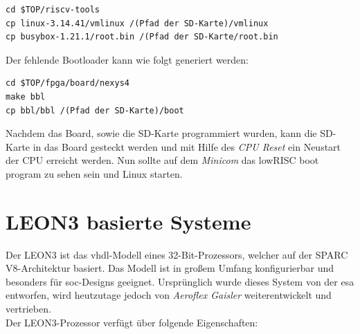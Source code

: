 \begin{lstlisting}
cd $TOP/riscv-tools
cp linux-3.14.41/vmlinux /(Pfad der SD-Karte)/vmlinux
cp busybox-1.21.1/root.bin /(Pfad der SD-Karte/root.bin
\end{lstlisting}


Der fehlende Bootloader kann wie folgt generiert werden:\\

\begin{lstlisting}
cd $TOP/fpga/board/nexys4
make bbl
cp bbl/bbl /(Pfad der SD-Karte)/boot
\end{lstlisting}

Nachdem das Board, sowie die SD-Karte programmiert wurden, kann die SD-Karte in das Board gesteckt werden und mit Hilfe des \emph{CPU Reset} ein Neustart der CPU erreicht werden.
Nun sollte auf dem \emph{Minicom} das lowRISC boot program zu sehen sein und Linux starten.\\
\newpage

\section{LEON3 basierte Systeme}\label{kap:leon3}

Der LEON3 ist das \ac{vhdl}-Modell eines 32-Bit-Prozessors, welcher auf der SPARC V8-Architektur basiert. Das Modell ist in großem Umfang konfigurierbar und besonders für \ac{soc}-Designs geeignet.
Ursprünglich wurde dieses System von der \ac{esa} entworfen, wird heutzutage jedoch von \emph{Aeroflex Gaisler} weiterentwickelt und vertrieben.\\
Der LEON3-Prozessor verfügt über folgende Eigenschaften:\cite{leon}\\

